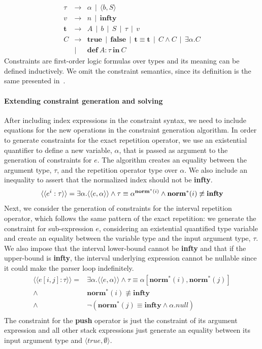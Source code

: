\documentclass[sigplan,screen]{acmart}
\theoremstyle{definition}
\begin{document}
  \[
    \begin{array}{lcl}
      \tau & \to & \alpha\,\mid\,\langle b, S \rangle\\
      v & \to & n\,\mid\,\mathbf{infty}\\
      \mathbf{t} & \to & A\,\mid\,b\,\mid\,S\,\mid\,\tau\,\mid\,v\\
      C    & \to & \mathbf{true}\,\mid\,\mathbf{false}\,\mid\,\mathbf{t} \equiv \mathbf{t}\,\mid\,C \land C\,\mid\, \exists
                   \alpha.C\\
           & \mid & \mathbf{def}\:A :\tau\:\mathbf{in}\:C
    \end{array}
  \]
Constraints are first-order logic formulas over types and its meaning
can be defined inductively. We omit the constraint semantics, since its
definition is the same presented in~\cite{Cardoso23}.

\paragraph{Extending constraint generation and solving} After including index expressions
in the constraint syntax, we need to include equations for the new operations
in the constraint generation algorithm.
In order to generate constraints for the exact repetition operator, we use
an existential quantifier to define a new variable, $\alpha$, that is passed
as argument to the generation of constraints for $e$. The algorithm creates
an equality between the argument type, $\tau$, and the repetition operator
type over $\alpha$. We also include an inequality to assert that the
normalized index should not be \textbf{infty}.
\[
  \langle\langle e^i : \tau \rangle\rangle = \exists \alpha . \langle\langle e,\alpha\rangle\rangle \land \tau \equiv \alpha^{\mathbf{norm}^*(i)} \land \mathbf{norm}^*(i) \not\equiv \mathbf{infty}\\
\]
Next, we consider the generation of constraints for the interval repetition operator, which
follows the same pattern of the exact repetition: we generate the constraint for sub-expression
$e$, considering an existential quantified type variable and create an equality between the variable
type and the input argument type, $\tau$. We also impose that the interval lower-bound
cannot be \textbf{infty} and that if the upper-bound is \textbf{infty}, the interval
underlying expression cannot be nullable since it could make the parser loop indefinitely.
\[
  \begin{array}{rl}
    \langle\langle e[i,j] : \tau \rangle\rangle =   & \exists \alpha . \langle\langle e, \alpha\rangle\rangle \land \tau \equiv \alpha[\mathbf{norm}^*(i),\mathbf{norm}^*(j)]\\
                                            \land{} & \mathbf{norm}^*(i) \not\equiv\mathbf{infty} \\
                                            \land{} & \neg (\mathbf{norm}^*(j) \equiv \mathbf{infty} \land \alpha.null)\\
  \end{array}
\]
The constraint for the \textbf{push} operator is just the constraint of its argument expression and
all other stack expressions just generate an equality between its input argument type and
$\langle true,\emptyset\rangle$.
\end{document}
